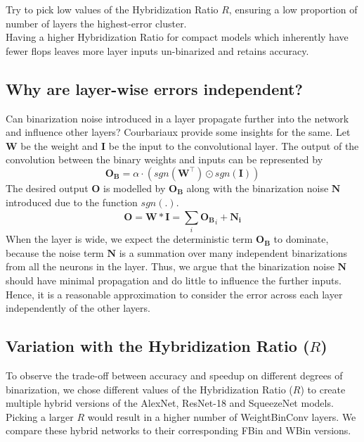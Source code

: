  Try to pick low values of the Hybridization Ratio $R$, ensuring a low proportion of number of layers the highest-error cluster.\\

 Having a higher Hybridization Ratio for compact models which inherently have fewer flops leaves more layer inputs un-binarized and retains accuracy. 

\subsection{Why are layer-wise errors independent?}
\noindent Can binarization noise introduced in a layer propagate further into the network and influence other layers? Courbariaux \etal \cite{courbariaux2016binarized} provide some insights for the same. Let $\mathbf{W}$ be the weight and $\mathbf{I}$ be the input to the convolutional layer. The output of the convolution between the binary weights and inputs can be represented by \begin{equation}\mathbf{O_B} = \alpha \cdot (sgn(\mathbf{W}^\intercal) \odot sgn(\mathbf{I}))\end{equation} The desired output $\mathbf{O}$ is modelled by $\mathbf{O_B}$ along with the binarization noise $\mathbf{N}$ introduced due to the function $sgn(.)$. \begin{equation}\mathbf{O} = \mathbf{W} * \mathbf{I} = \sum_{i}^{} \mathbf{O_B}_i + \mathbf{N_i}\end{equation} When the layer is wide, we expect the deterministic term $\mathbf{O_B}$ to dominate, because the noise term $\mathbf{N}$ is a summation over many independent binarizations from all the neurons in the layer. Thus, we argue that the binarization noise $\mathbf{N}$ should have minimal propagation and do little to influence the further inputs. Hence, it is a reasonable approximation to consider the error across each layer independently of the other layers.

\subsection{Variation with the Hybridization Ratio ($R$)}
\noindent To observe the trade-off between accuracy and speedup on different degrees of binarization, we chose different values of the Hybridization Ratio ($R$) to create multiple hybrid versions of the AlexNet, ResNet-18 and SqueezeNet models. Picking a larger $R$ would result in a higher number of WeightBinConv layers. We compare these hybrid networks to their corresponding FBin and WBin versions. \\

